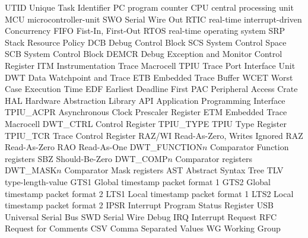  {UTID} {{Unique Task Identifier}}
 {PC} {{program counter}}
 {CPU} {{central processing unit}}
 {MCU} {{\gls{microcontroller-unit}}}
 {SWO} {{Serial Wire Out}}
 {RTIC} {\Gls{real-time} \Gls{interrupt}-driven Concurrency}
 {FIFO} {{Fist-In, First-Out}}
 {RTOS} {{\gls{real-time} operating system}}
 {SRP} {{Stack Resource Policy}}
 {DCB} {{Debug Control Block}}
 {SCS} {{System Control Space}}
 {SCB} {{System Control Block}}
 {DEMCR} {{Debug Exception and Monitor Control Register}}
 {ITM} {{Instrumentation Trace Macrocell}}
 {TPIU} {{Trace Port Interface Unit}}
 {DWT} {{Data Watchpoint and Trace}}
 {ETB} {{Embedded Trace Buffer}}
 {WCET} {{Worst Case Execution Time}}
 {EDF} {{Earliest Deadline First}}
 {PAC} {{Peripheral Access Crate}}
 {HAL} {{Hardware Abstraction Library}}
 {API} {{Application Programming Interface}}
 {TPIU\_ACPR} {{Asynchronous Clock Prescaler Register}}
 {ETM} {{Embedded Trace Macrocell}}
 {DWT\_CTRL} {{Control Register}}
 {TPIU\_TYPE} {{TPIU Type Register}}
 {TPIU\_TCR} {{Trace Control Register}}
 {RAZ/WI} {{Read-As-Zero, Writes Ignored}}
 {RAZ} {{Read-As-Zero}}
 {RAO} {{Read-As-One}}
 {DWT\_FUNCTION$n$} {{Comparator Function registers}}
 {SBZ} {{Should-Be-Zero}}
 {DWT\_COMP$n$} {{Comparator registers}}
 {DWT\_MASK$n$} {{Comparator Mask registers}}
 {AST} {{Abstract Syntax Tree}}
 {TLV} {{type-length-value}}
 {GTS1} {{Global timestamp packet format 1}}
 {GTS2} {{Global timestamp packet format 2}}
 {LTS1} {{Local timestamp packet format 1}}
 {LTS2} {{Local timestamp packet format 2}}
 {IPSR} {{Interrupt Program Status Register}}
 {USB} {{Universal Serial Bus}}
 {SWD} {{Serial Wire Debug}}
 {IRQ} {{Interrupt Request}}
 {RFC} {{Request for Comments}}
 {CSV} {{Comma Separated Values}}
 {WG} {{Working Group}}
